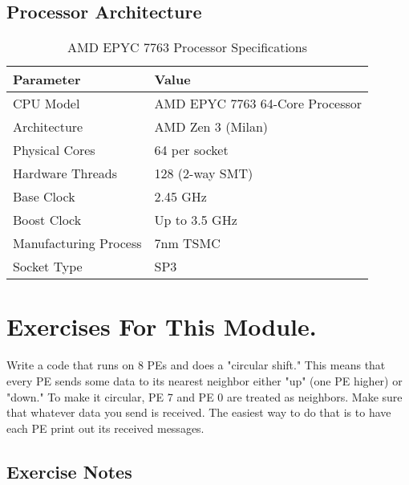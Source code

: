 \documentclass[11pt]{article}
\begin{document}
\subsection{Processor Architecture}

\begin{table}[H]
\centering
\caption{AMD EPYC 7763 Processor Specifications}
\label{tab:processor_specs}
\begin{tabular}{@{}ll@{}}
\hline
\textbf{Parameter} & \textbf{Value} \\
\hline
CPU Model & AMD EPYC 7763 64-Core Processor \\
Architecture & AMD Zen 3 (Milan) \\
Physical Cores & 64 per socket \\
Hardware Threads & 128 (2-way SMT) \\
Base Clock & 2.45 GHz \\
Boost Clock & Up to 3.5 GHz \\
Manufacturing Process & 7nm TSMC \\
Socket Type & SP3 \\
\hline
\end{tabular}
\end{table}



\section{Exercises For This Module.}
Write a code that runs on 8 PEs and does a "circular shift." This means that every PE sends some data to its nearest neighbor either "up" (one PE higher) or "down." To make it circular, PE 7 and PE 0 are treated as neighbors. Make sure that whatever data you send is received. The easiest way to do that is to have each PE print out its received messages.



\subsection{Exercise Notes}
\end{document}
